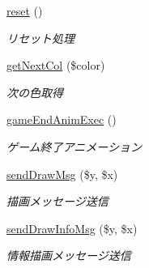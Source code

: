\begin{DoxyCompactItemize}
\hyperlink{class_reversi_play_a4a20559544fdf4dcb457e258dc976cf8}{reset} ()
\begin{DoxyCompactList}\small\item\em リセット処理 \end{DoxyCompactList}\item 
\hyperlink{class_reversi_play_a26fd2d7723695b69cbfde7e16b55b096}{get\+Next\+Col} (\$color)
\begin{DoxyCompactList}\small\item\em 次の色取得 \end{DoxyCompactList}\item 
\hyperlink{class_reversi_play_acbcd366da8242203ae52fb685fbc929e}{game\+End\+Anim\+Exec} ()
\begin{DoxyCompactList}\small\item\em ゲーム終了アニメーション \end{DoxyCompactList}\item 
\hyperlink{class_reversi_play_af27aaf13f15a080c006432338a06c481}{send\+Draw\+Msg} (\$y, \$x)
\begin{DoxyCompactList}\small\item\em 描画メッセージ送信 \end{DoxyCompactList}\item 
\hyperlink{class_reversi_play_a829b61937e857a9f1b5b371be25dbabd}{send\+Draw\+Info\+Msg} (\$y, \$x)
\begin{DoxyCompactList}\small\item\em 情報描画メッセージ送信 \end{DoxyCompactList}\end{DoxyCompactItemize}
